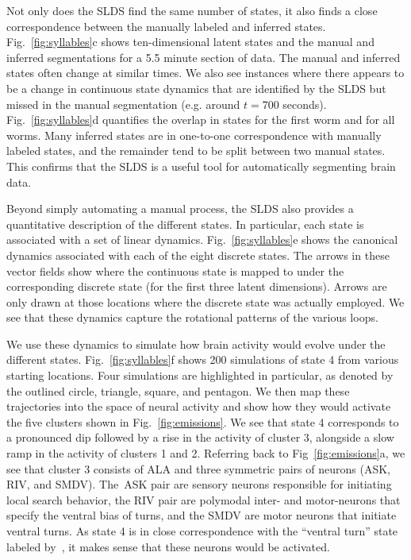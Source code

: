 \documentclass[11pt]{article}
\begin{document}
Not only does the SLDS find the same number of states, it also finds a
close correspondence between the manually labeled and inferred states.
Fig.~\ref{fig:syllables}c shows ten-dimensional latent states and the
manual and inferred segmentations for a 5.5 minute section of data.
The manual and inferred states often change at similar times. We also
see instances where there appears to be a change in continuous state
dynamics that are identified by the SLDS but missed in the manual
segmentation (e.g. around $t=700$ seconds).  Fig.~\ref{fig:syllables}d
quantifies the overlap in states for the first worm and for all worms.
Many inferred states are in one-to-one correspondence with manually
labeled states, and the remainder tend to be split between two manual
states.  This confirms that the SLDS is a useful tool for automatically
segmenting brain data.

Beyond simply automating a manual process, the SLDS also provides a
quantitative description of the different states.  In particular, each
state is associated with a set of linear dynamics.
Fig.~\ref{fig:syllables}e shows the canonical dynamics associated with
each of the eight discrete states. The arrows in these vector fields
show where the continuous state is mapped to under the corresponding
discrete state (for the first three latent dimensions).  Arrows are
only drawn at those locations where the discrete state was actually
employed.  We see that these dynamics capture the rotational patterns
of the various loops.

We use these dynamics to simulate how brain activity would evolve
under the different states. Fig.~\ref{fig:syllables}f shows 200
simulations of state 4 from various starting locations.  Four
simulations are highlighted in particular, as denoted by the outlined
circle, triangle, square, and pentagon.  We then map these
trajectories into the space of neural activity and show how they would
activate the five clusters shown in Fig.~\ref{fig:emissions}.  We see
that state 4 corresponds to a pronounced dip followed by a rise in the
activity of cluster 3, alongside a slow ramp in the activity of
clusters 1 and 2. Referring back to Fig~\ref{fig:emissions}a, we see
that cluster 3 consists of \textsf{ALA} and three symmetric pairs of
neurons (\textsf{ASK}, \textsf{RIV}, and \textsf{SMDV}).  The~\textsf{ASK}
pair are sensory neurons responsible for initiating local search behavior,
the \textsf{RIV} pair are polymodal inter- and motor-neurons that specify
the ventral bias of turns, and the \textsf{SMDV} are motor neurons
that initiate ventral turns. As state 4 is in close correspondence with
the ``ventral turn'' state labeled by~\citet{kato2015global}, it makes
sense that these neurons would be activated.
\end{document}
